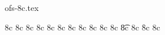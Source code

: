 

\protectreading ofs-8c.tex %

\ifx \characterdef \undefined  \fi


\accentdef \capitalgrave         * 8c  { }
\accentdef \capitalacute         * 8c  { }
\accentdef \capitalcircumflex    * 8c  { }
\accentdef \capitaltilde         * 8c  { }
\accentdef \capitaldieresis      * 8c  { }
\accentdef \capitalhungarumlaut  * 8c  { }
\accentdef \capitalring          * 8c  { }
\accentdef \capitalcaron         * 8c  { }
\accentdef \capitalbreve         * 8c  { }
\accentdef \capitalmacron        * 8c  { }
\accentdef \capitaldotaccent     * 8c  { }
\accentdef \t                    * 8c  { }
\accentdef \capitaltie           * 8c  { }
\accentdef \newtie               * 8c  { }
\accentdef \capitalnewtie        * 8c  { }


